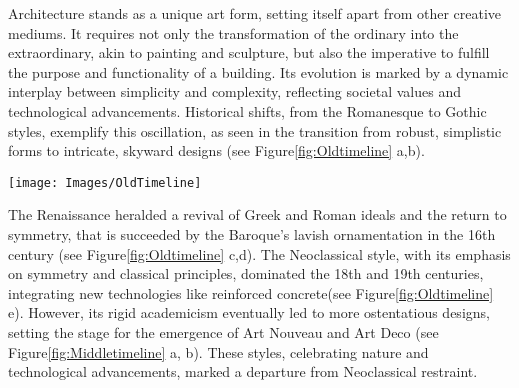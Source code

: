 


Architecture stands as a unique art form, setting itself apart from other creative mediums.
It requires not only the transformation of the ordinary into the extraordinary, akin to painting and sculpture, but also the imperative to fulfill the purpose and functionality of a building\cite{Hnin2022}.
Its evolution is marked by a dynamic interplay between simplicity and complexity, reflecting societal values and technological advancements\cite{Economakis2023}.
Historical shifts, from the Romanesque to Gothic styles, exemplify this oscillation, as seen in the transition from robust, simplistic forms to intricate, skyward designs\cite{Arora2023, Stacbond2020} (see Figure\ref{fig:Oldtimeline} a,b).

\begin{figure*}[htb]
\centering
\texttt{[image: Images/OldTimeline]}
\caption{Example of historical oscillations between complexity and simplicity in architecture history. (Left to right) Romanesque, Gothic, Classicism, Baroque, Neo-classicism. (\textit{Images edited from source})}
\label{fig:Oldtimeline}
\end{figure*}

The Renaissance heralded a revival of Greek and Roman ideals and the return to symmetry, that is succeeded by the Baroque's lavish ornamentation in the 16th century\cite{Economakis2023} (see Figure\ref{fig:Oldtimeline} c,d).
The Neoclassical style, with its emphasis on symmetry and classical principles, dominated the 18th and 19th centuries, integrating new technologies like reinforced concrete\cite{Economakis2023}(see Figure\ref{fig:Oldtimeline} e).
However, its rigid academicism eventually led to more ostentatious designs, setting the stage for the emergence of Art Nouveau and Art Deco (see Figure\ref{fig:Middletimeline} a, b).
These styles, celebrating nature and technological advancements, marked a departure from Neoclassical restraint\cite{Salas2018, Arora2023}.

